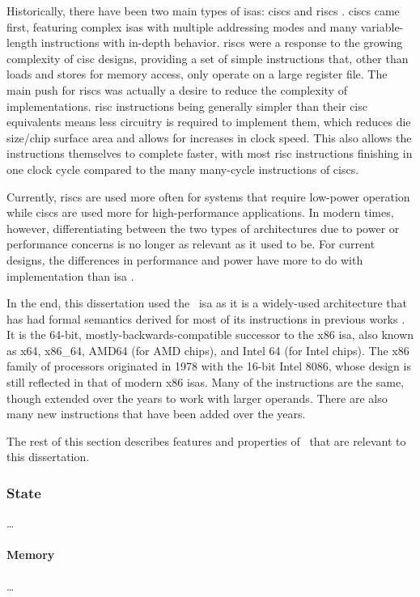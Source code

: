 Historically, there have been two main types of \acp{isa}:
\acp{cisc} and \acp{risc} \autocite{jamil1995rc}.
\Acp{cisc} came first, featuring complex \acp{isa} with multiple addressing modes
and many variable-length instructions with in-depth behavior.
\Acp{risc} were a response to the growing complexity of \ac{cisc} designs,
providing a set of simple instructions that,
other than loads and stores for memory access, only operate on a large register file.
The main push for \acp{risc} was actually a desire
to reduce the complexity of implementations. \Ac{risc} instructions being
generally simpler than their \ac{cisc} equivalents
means less circuitry is required to implement them,
which reduces die size/chip surface area and allows for increases in clock speed.
This also allows the instructions themselves to complete faster,
with most \ac{risc} instructions finishing in one clock cycle
compared to the many many-cycle instructions of \acp{cisc}.

Currently, \acp{risc} are used more often for systems that require
low-power operation while \acp{cisc} are used more for high-performance applications.
In modern times, however, differentiating between the two types of architectures
due to power or performance concerns is no longer as relevant as it used to be.
For current designs, the differences in performance and power
have more to do with implementation than \ac{isa} \autocite{blem2013struggles}.

In the end,
this dissertation used the \arch\ \ac{isa} as it is a widely-used architecture
that has had formal semantics derived for most of its instructions
in previous works \autocite{heule2016stratified,roessle2019}.
It is the 64-bit, mostly-backwards-compatible successor to the x86 \ac{isa},
also known as x64, x86\_64, AMD64 (for AMD chips), and Intel 64 (for Intel chips).
The x86 family of processors originated in 1978 with the 16-bit Intel 8086,
whose design is still reflected in that of modern x86 \acp{isa}.
Many of the instructions are the same,
though extended over the years to work with larger operands.
There are also many new instructions that have been added over the years.

The rest of this section describes features and properties of \arch\ that are relevant
to this dissertation.

\subsubsection{State}
\todo\dots
\paragraph{Memory}
\todo\dots


